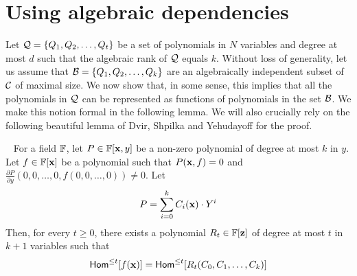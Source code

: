 \section{Using algebraic dependencies}
Let ${\cal Q} = \{Q_1, Q_2, \ldots, Q_t\}$ be a set of polynomials in $N$ variables and degree at most $d$ such that the algebraic rank of ${\cal Q}$ equals $k$. Without loss of generality, let us assume that ${\cal B} = \{Q_1, Q_2, \ldots, Q_k\}$ are an algebraically independent subset of $\cal C$ of maximal size. We now show that, in some sense, this implies that all the polynomials in ${\cal Q}$ can be represented as functions of  polynomials in the set ${\cal B}$. We make this notion formal in the following lemma. We will also crucially rely on the following beautiful lemma of Dvir, Shpilka and Yehudayoff for the proof. 

\begin{lemma}~\label{lem:DSY main}
For a field $\mathbb{F}$, let $P \in \mathbb{F}[\mathbf{x}, y]$ be a non-zero polynomial of degree at most $k$ in $y$. Let $f \in \mathbb{F}[\mathbf{x}]$ be a polynomial such that $P(\mathbf{x}, f) = 0$ and $\frac{\partial P}{\partial y} (0, 0, \ldots, 0, f(0, 0, \ldots, 0))\neq 0$. Let $$P = \sum_{i = 0}^k C_i(\mathbf{x})\cdot Y^i$$ Then, for every $t \geq 0$, there exists a polynomial $R_t \in \mathbb{F}[\mathbf{z}]$ of degree at most $t$ in $k+1$ variables such that $$\mathsf{Hom}^{\leq t}[f(\mathbf{x})] = \mathsf{Hom}^{\leq t}[R_t(C_0, C_1, \ldots, C_k)] $$
\end{lemma} 



